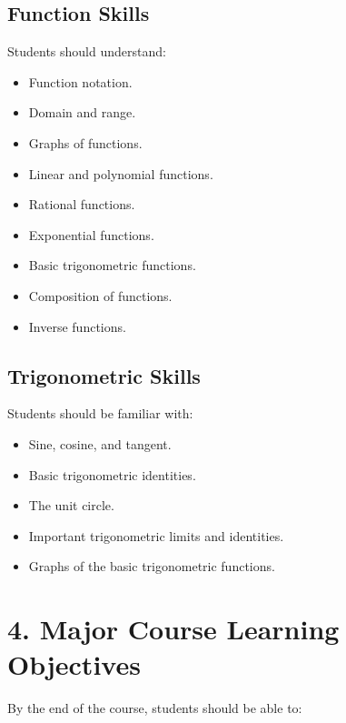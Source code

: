 \documentclass[11pt]{article}
\begin{document}
\subsection{Function Skills}

Students should understand:

\begin{itemize}
    \item Function notation.
    \item Domain and range.
    \item Graphs of functions.
    \item Linear and polynomial functions.
    \item Rational functions.
    \item Exponential functions.
    \item Basic trigonometric functions.
    \item Composition of functions.
    \item Inverse functions.
\end{itemize}

\subsection{Trigonometric Skills}

Students should be familiar with:

\begin{itemize}
    \item Sine, cosine, and tangent.
    \item Basic trigonometric identities.
    \item The unit circle.
    \item Important trigonometric limits and identities.
    \item Graphs of the basic trigonometric functions.
\end{itemize}

\section{4. Major Course Learning Objectives}

By the end of the course, students should be able to:
\end{document}
